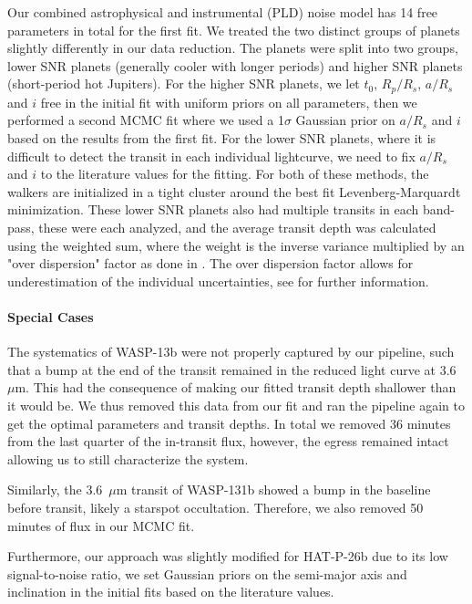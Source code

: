 Our combined astrophysical and instrumental (PLD) noise model has 14 free parameters in total for the first fit. We treated the two distinct groups of planets slightly differently in our data reduction. The planets were split into two groups, lower SNR planets (generally cooler with longer periods) and higher SNR planets (short-period hot Jupiters). For the higher SNR planets, we let $t_0$, $R_p/R_s$, $a/R_s$ and $i$ free in the initial fit with uniform priors on all parameters, then we performed a second MCMC fit where we used a 1$\sigma$ Gaussian prior on $a/R_s$ and $i$ based on the results from the first fit. For the lower SNR planets, where it is difficult to detect the transit in each individual lightcurve, we need to fix $a/R_s$ and $i$ to the literature values for the fitting. For both of these methods, the walkers are initialized in a tight cluster around the best fit Levenberg-Marquardt minimization. These lower SNR planets also had multiple transits in each band-pass, these were each analyzed, and the average transit depth was calculated using the weighted sum, where the weight is the inverse variance multiplied by an "over dispersion" factor as done in \citet{Ingalls2016}. The over dispersion factor allows for underestimation of the individual uncertainties, see \citet{Lyons1992} for further information.

\paragraph{Special Cases}

The systematics of WASP-13b were not properly captured by our pipeline, such that a bump at the end of the transit remained in the reduced light curve at 3.6~$\mu$m. This had the consequence of making our fitted transit depth shallower than it would be. We thus removed this data from our fit and ran the pipeline again to get the optimal parameters and transit depths. In total we removed 36 minutes from the last quarter of the in-transit flux, however, the egress remained intact allowing us to still characterize the system.

Similarly, the 3.6~$\mu$m transit of WASP-131b showed a bump in the baseline before transit, likely a starspot occultation. Therefore, we also removed 50 minutes of flux in our MCMC fit.

Furthermore, our approach was slightly modified for HAT-P-26b due to its low signal-to-noise ratio, we set  Gaussian priors on the semi-major axis and inclination in the initial fits based on the literature values.

